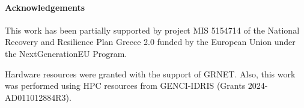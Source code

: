 \paragraph{Acknowledgements}

This work has been partially supported by project MIS 5154714 of the National Recovery and Resilience Plan Greece 2.0 funded by the European Union under the NextGenerationEU Program. 

Hardware resources were granted with the support of GRNET. Also, this work was performed using HPC resources from GENCI-IDRIS (Grants 2024-AD011012884R3). 

